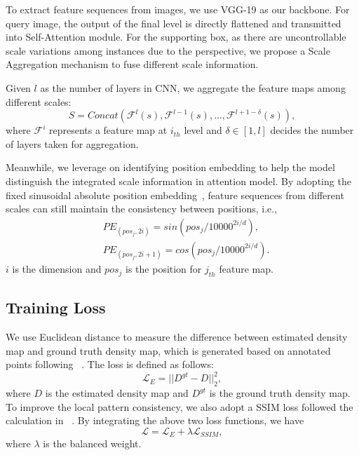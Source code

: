 \documentclass{article}
\begin{document}
To extract feature sequences from images, we use VGG-19 as our backbone. For query image, the output of the final level is directly flattened and transmitted into Self-Attention module. For the supporting box, as there are uncontrollable scale variations among instances due to the perspective, we propose a Scale Aggregation mechanism to fuse different scale information.

Given $l$ as the number of layers in CNN, we aggregate the feature maps among different scales:
\begin{equation}
    S = Concat(\mathcal{F}^l(s), \mathcal{F}^{l-1}(s),...,\mathcal{F}^{l+1-\delta}(s)),
\end{equation}
where $\mathcal{F}^i$ represents a feature map at $i_{th}$ level and $\delta \in [1, l]$ decides the number of layers taken for aggregation.

Meanwhile, we leverage on identifying position embedding to help the model distinguish the integrated scale information in attention model. By adopting the fixed sinusoidal absolute position embedding~\cite{vaswani2017attention}, feature sequences from different scales can still maintain the consistency between positions, i.e., 
\begin{equation}
\begin{aligned}
    &PE_{(pos_j, 2i)} = sin(pos_j / 10000^{2i/d}),\\
    &PE_{(pos_j, 2i+1)} = cos(pos_j / 10000^{2i/d}).
\end{aligned}
\end{equation}
$i$ is the dimension and $pos_j$ is the position for $j_{th}$ feature map.


\subsection{Training Loss}

We use Euclidean distance to measure the difference between estimated density map and ground truth density map, which is generated based on annotated points following ~\cite{zhang2016single}. The loss is defined as follows:
\begin{equation}
    \mathcal{L}_E = ||D^{gt}-D||^2_2,
\end{equation}
where $D$ is the estimated density map and $D^{gt}$ is the ground truth density map. To improve the local pattern consistency, we also adopt a SSIM loss followed the calculation in ~\cite{cao2018scale}. By integrating the above two loss functions, we have
\begin{equation}
    \mathcal{L} = \mathcal{L}_E + \lambda \mathcal{L}_{SSIM},
\end{equation}
where $\lambda$ is the balanced weight.
\end{document}
